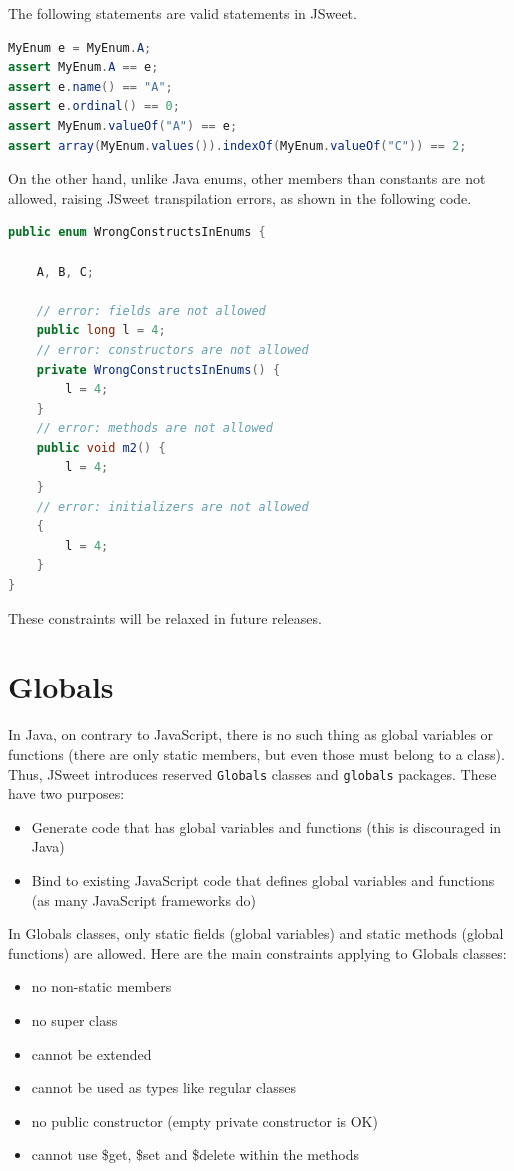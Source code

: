 \documentclass[a4paper]{report}
\begin{document}
The following statements are valid statements in JSweet.

\begin{lstlisting}[language=Java]
MyEnum e = MyEnum.A;
assert MyEnum.A == e;
assert e.name() == "A";
assert e.ordinal() == 0;
assert MyEnum.valueOf("A") == e;
assert array(MyEnum.values()).indexOf(MyEnum.valueOf("C")) == 2;
\end{lstlisting}

On the other hand, unlike Java enums, other members than constants are not allowed, raising JSweet transpilation errors, as shown in the following code.

\begin{lstlisting}[language=Java]
public enum WrongConstructsInEnums {

	A, B, C;
	
	// error: fields are not allowed
	public long l = 4;
	// error: constructors are not allowed	
	private WrongConstructsInEnums() {
		l = 4;
	}
	// error: methods are not allowed
	public void m2() {
		l = 4;
	}
	// error: initializers are not allowed
	{
		l = 4;
	}
}
\end{lstlisting}

These constraints will be relaxed in future releases.

\section{Globals}

In Java, on contrary to JavaScript, there is no such thing as global variables or functions (there are only static members, but even those must belong to a class). Thus, JSweet introduces reserved \texttt{Globals} classes and \texttt{globals} packages. These have two purposes:

\begin{itemize}
\item Generate code that has global variables and functions (this is discouraged in Java)
\item Bind to existing JavaScript code that defines global variables and functions (as many JavaScript frameworks do)
\end{itemize}

In Globals classes, only static fields (global variables) and static methods (global functions) are allowed. Here are the main constraints applying to Globals classes:

\begin{itemize}
\item no non-static members
\item no super class
\item cannot be extended
\item cannot be used as types like regular classes
\item no public constructor (empty private constructor is OK)
\item cannot use \$get, \$set and \$delete within the methods
\end{itemize}
\end{document}
